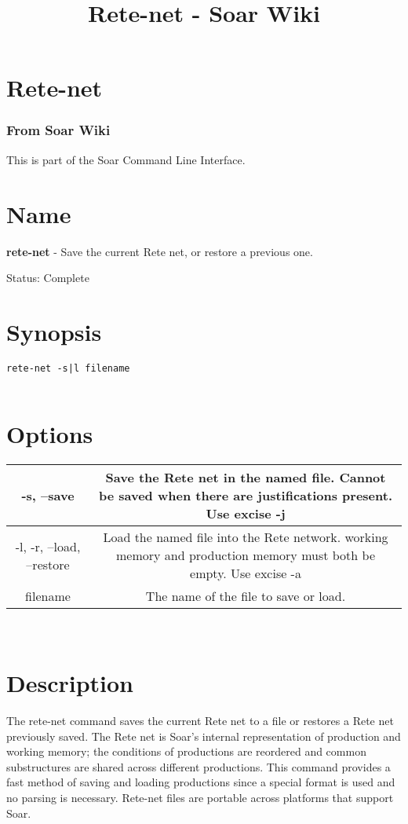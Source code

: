 \documentclass[10pt]{article}
\title{Rete-net - Soar Wiki}
\begin{document}
\section*{Rete-net}
\subsubsection*{From Soar Wiki}


 This is part of the Soar Command Line Interface. 
\section*{ Name }


 \textbf{rete-net}
 - Save the current Rete net, or restore a previous one. 


 Status: Complete
\section*{ Synopsis }
\begin{verbatim}
rete-net -s|l filename
 

\end{verbatim}
\section*{ Options }


\begin{tabular}{|c|c|}
\hline 
 -s, --save  & Save the Rete net in the named file. Cannot be saved when there are justifications present. Use excise -j \\
 \hline 
 -l, -r, --load, --restore  & Load the named file into the Rete network. working memory and production memory must both be empty. Use excise -a \\
 \hline 
filename & The name of the file to save or load.  \\
 \hline 

\end{tabular}



 \\ 

\section*{ Description }


 The rete-net command saves the current Rete net to a file or restores a Rete net previously saved. The Rete net is Soar's internal representation of production and working memory; the conditions of productions are reordered and common substructures are shared across different productions. This command provides a fast method of saving and loading productions since a special format is used and no parsing is necessary. Rete-net files are portable across platforms that support Soar. 
\end{document}
